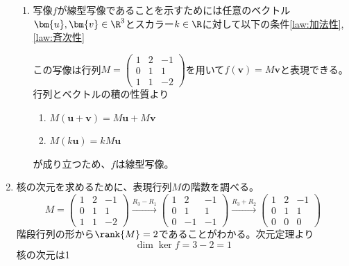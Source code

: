 \begin{souanswer}
\begin{enumerate}
\begin{enumerate_roman}
\end{enumerate_roman}
\begin{enumerate}
	\item 写像$f$が線型写像であることを示すためには任意のベクトル$\bm{u}, \bm{v}\in \R^3$とスカラー$k\in \R$に対して以下の条件\ref{law:加法性}, \ref{law:斉次性}
	この写像は行列$M= \begin{pmatrix}1& 2& -1\\ 0& 1& 1\\ 1& 1& -2\end{pmatrix}$を用いて$f(\bm{v})= M\bm{v}$と表現できる。行列とベクトルの積の性質より
\begin{enumerate}
	\item $M(\bm{u}+ \bm{v})= M\bm{u}+ M\bm{v}$
	\item $M(k\bm{u})= kM\bm{u}$
\end{enumerate}
	が成り立つため、$f$は線型写像。
\end{enumerate}
	\item 核の次元を求めるために、表現行列$M$の階数を調べる。
\begin{equation*}
	M= \begin{pmatrix}1& 2& -1\\ 0& 1& 1\\ 1& 1& -2\end{pmatrix}
\stackrel{R_3- R_1}{\longrightarrow} \begin{pmatrix}1& 2& -1\\ 0& 1& 1\\ 0& -1& -1\end{pmatrix}\stackrel{R_3+ R_2}{\longrightarrow}
\begin{pmatrix}1& 2& -1\\ 0& 1& 1\\ 0& 0& 0\end{pmatrix}
\end{equation*}
	階段行列の形から$\rank{M}= 2$であることがわかる。次元定理より
\begin{equation*}
	\dim{\ker{f}}= 3- 2= 1
\end{equation*}
	核の次元は1
\end{enumerate}
\end{souanswer}
